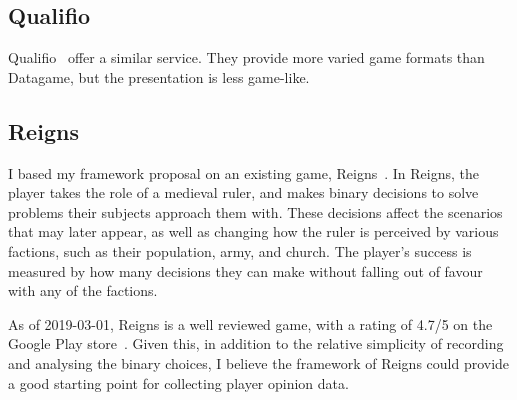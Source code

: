 \subsection{Qualifio}
Qualifio~\cite{Qualifio} offer a similar service. They provide more varied game formats than Datagame, but the presentation is less game-like. 

\subsection{Reigns}
I based my framework proposal on an existing game, Reigns~\cite{Reigns}. 
In Reigns, the player takes the role of a medieval ruler, and makes binary decisions to solve problems their subjects approach them with. 
These decisions affect the scenarios that may later appear, as well as changing how the ruler is perceived by various factions, such as their population, army, and church. 
The player's success is measured by how many decisions they can make without falling out of favour with any of the factions.

As of 2019-03-01, Reigns is a well reviewed game, with a rating of 4.7/5 on the Google Play store~\cite{GooglePlay}. 
Given this, in addition to the relative simplicity of recording and analysing the binary choices, I believe the framework of Reigns could provide a good starting point for collecting player opinion data. 
